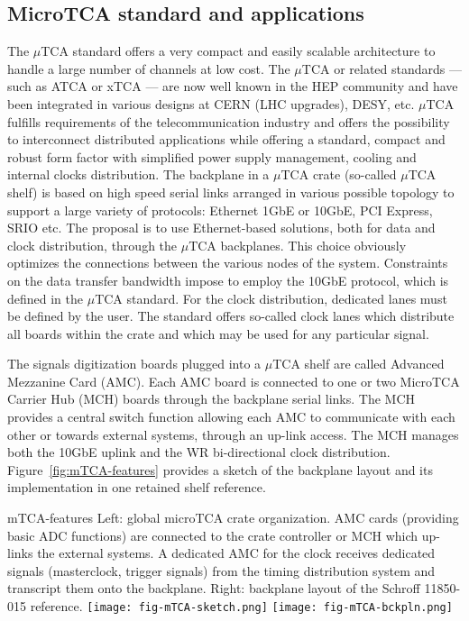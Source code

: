 \subsection{MicroTCA standard and applications}
The $\mu$TCA standard offers a very compact and easily scalable
architecture to handle a large number of channels at low cost. The
$\mu$TCA or related standards --- such as ATCA or xTCA --- are now well
known in the HEP community and have been integrated in various designs
at CERN (LHC upgrades), DESY, etc.  $\mu$TCA fulfills requirements of
the telecommunication industry and offers the possibility to
interconnect distributed applications while offering a standard,
compact and robust form factor with simplified power supply
management, cooling and internal clocks distribution. The backplane in
a $\mu$TCA crate (so-called $\mu$TCA shelf) is based on high speed
serial links arranged in various possible topology to support a large
variety of protocols: Ethernet 1GbE or 10GbE, PCI Express, SRIO
etc. The proposal is to use Ethernet-based solutions, both for data
and clock distribution, through the $\mu$TCA backplanes. This choice
obviously optimizes the connections between the various nodes of the
system. Constraints on the data transfer bandwidth impose to employ
the 10GbE protocol, which is defined in the $\mu$TCA standard. For the
clock distribution, dedicated lanes must be defined by the user. The
standard offers so-called clock lanes which distribute all boards
within the crate and which may be used for any particular signal.

The signals digitization boards plugged into a $\mu$TCA shelf are
called Advanced Mezzanine Card (AMC)\cite{picmg-2006}. Each AMC board
is connected to one or two MicroTCA Carrier Hub (MCH) boards through
the backplane serial links. The MCH provides a central switch function
allowing each AMC to communicate with each other or towards external
systems, through an up-link access. The MCH manages both the 10GbE
uplink and the WR bi-directional clock distribution.
Figure~\ref{fig:mTCA-features} provides a sketch of the backplane
layout and its implementation in one retained shelf reference.
\begin{cdrfigure}{mTCA-features}
{\small Left: global microTCA crate organization. AMC cards 
(providing basic ADC functions) are connected to the crate 
controller or MCH which up-links the external systems. A dedicated 
AMC for the clock receives dedicated signals (masterclock, trigger 
signals) from the timing distribution system and transcript them onto 
the backplane. Right: backplane layout of the Schroff 11850-015 reference.}
\texttt{[image: fig-mTCA-sketch.png]}\hfill
\texttt{[image: fig-mTCA-bckpln.png]}
\end{cdrfigure}

